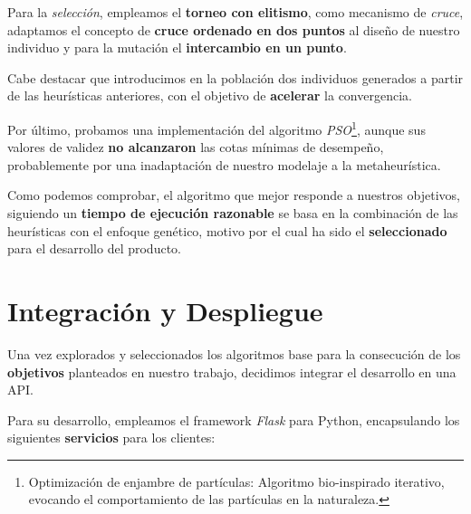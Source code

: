 Para la \textit{selección}, empleamos el \textbf{torneo con elitismo}, como mecanismo de \textit{cruce}, adaptamos el concepto de \textbf{cruce ordenado en dos puntos} al diseño de nuestro individuo \cite{Lin2020AScheduling} y para la mutación el \textbf{intercambio en un punto}.

 Cabe destacar que introducimos en la población dos individuos generados a partir de las heurísticas anteriores, con el objetivo de \textbf{acelerar} la convergencia.

 Por último, probamos una implementación del algoritmo \textit{PSO}\footnote{Optimización de enjambre de partículas:  Algoritmo bio-inspirado iterativo, evocando el comportamiento de las partículas en la naturaleza.}, aunque sus valores de validez \textbf{no alcanzaron }las cotas mínimas de desempeño, probablemente por una inadaptación de nuestro modelaje a la metaheurística.


 Como podemos comprobar, el algoritmo que mejor responde a nuestros objetivos, siguiendo un \textbf{tiempo de ejecución razonable} se basa en la combinación de las heurísticas con el enfoque genético, motivo por el cual ha sido el \textbf{seleccionado} para el desarrollo del producto.


 \newpage

 \section{Integración y Despliegue}

 Una vez explorados y seleccionados los algoritmos base para la consecución de los \textbf{objetivos} planteados en nuestro trabajo, decidimos integrar el desarrollo en una API.

 Para su desarrollo, empleamos el framework \textit{Flask} \cite{Grinberg2018FlaskPython} para Python, encapsulando los siguientes \textbf{servicios} para los clientes:
 
